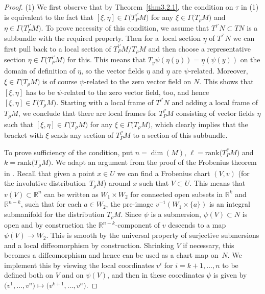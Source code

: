 \documentclass[10pt,a4paper]{amsart}
\numberwithin{equation}{section}
\def\Bbb{\mathbb}
\newcommand{\x}{\times}
\newcommand{\Ga}{\Gamma}
\begin{document}
\begin{proof}
 (1) We first observe that by Theorem~\ref{thm3.2.1}, the condition on $\tau$ in (1)
 is equivalent to the fact that $[\xi,\eta]\in\Ga\bigl(T^{i'}_PM\bigr)$ for any
 $\xi\in\Ga\bigl(T_\rho M\bigr)$ and $\eta\in\Ga\bigl(T^{i'}_PM\bigr)$. To prove necessity of this
 condition, we assume that $T^{i'}N\subset TN$ is a subbundle with the required
 property. Then for a~local section $\underline{\eta}$ of $T^{i'}N$ we can first
 pull back to a local section of $T^{i'}_PM/T_\rho M$ and then choose a
 representative section $\eta\in\Ga\bigl(T^{i'}_PM\bigr)$ for this. This means that
 $T_y\psi(\eta(y))=\underline{\eta}(\psi(y))$ on the domain of definition of $\eta$,
 so the vector fields $\eta$ and $\underline{\eta}$ are $\psi$-related. Moreover,
 $\xi\in\Ga\bigl(T_\rho M\bigr)$ is of course $\psi$-related to the zero vector field on
 $N$. This shows that $[\xi,\eta]$ has to be $\psi$-related to the zero vector
 field, too, and hence $[\xi,\eta]\in\Ga\bigl(T_\rho M\bigr)$. Starting with a local frame of
 $T^{i'}N$ and adding a local frame of $T_\rho M$, we conclude that there are local
 frames for $T^{i'}_PM$ consisting of vector fields $\eta$ such that
 $[\xi,\eta]\in\Ga\bigl(T_\rho M\bigr)$ for any $\xi\in\Ga\bigl(T_\rho M\bigr)$, which clearly implies
 that the bracket with $\xi$ sends any section of $T^{i'}_PM$ to a section of this
 subbundle.

To prove sufficiency of the condition, put $n=\dim(M)$, $\ell=\text{rank}\bigl(T^{i'}_PM\bigr)$
and $k=\text{rank}\bigl(T_\rho M\bigr)$. We adapt an argument from the proof of the Frobenius
theorem in \cite[Section 3.18]{Michor:topics}. Recall that given a point $x\in U$ we
can find a Frobenius chart $(V,v)$ (for the involutive distribution~$T_\rho M$)
around $x$ such that $V\subset U$. This means that $v(V)\subset\Bbb R^n$ can be
written as $W_1\x W_2$ for connected open subsets in $\Bbb R^k$ and $\Bbb R^{n-k}$,
such that for each $a\in W_2$, the pre-image $v^{-1}(W_1\x\{a\})$ is an integral
submanifold for the distribution $T_\rho M$. Since $\psi$ is a submersion,
$\psi(V)\subset N$ is open and by construction the $\Bbb R^{n-k}$-component of $v$
descends to a map $\psi(V)\to W_2$. This is smooth by the universal property of
surjective submersions and a local diffeomorphism by construction. Shrinking $V$ if
necessary, this becomes a diffeomorphism and hence can be used as a chart map on~$N$.
We implement this by viewing the local coordinates $v^i$ for $i=k+1,\dots, n$ to
be defined both on $V$ and on $\psi(V)$, and then in these coordinates $\psi$ is
given by $\bigl(v^1,\dots,v^n\bigr)\mapsto \bigl(v^{k+1},\dots,v^n\bigr)$.


\end{proof}
\end{document}
